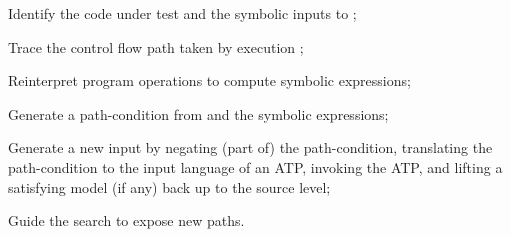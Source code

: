 \documentclass{IOS-Book-Article}
\begin{document}
\begin{mdUl}[class={list-star,compact},data-line={305}]%
\begin{mdLi}[data-line={305}]%
{}Identify the code under test %
{}%
{} and the symbolic inputs to %
{}%
{};%
\end{mdLi}%
\begin{mdLi}[data-line={306}]%
{}Trace the control flow path %
{}%
{} taken by execution %
{}%
{};%
\end{mdLi}%
\begin{mdLi}[data-line={307}]%
{}Reinterpret program operations to compute symbolic expressions;%
\end{mdLi}%
\begin{mdLi}[data-line={308}]%
{}Generate a path-condition from %
{}%
{} and the symbolic expressions;%
\end{mdLi}%
\begin{mdLi}[data-line={309}]%
{}Generate a new input %
{}%
{} by negating (part of) the path-condition, translating
the path-condition to the input language of an ATP, invoking the ATP, and
lifting a satisfying model (if any) back up to the source level;%
\end{mdLi}%
\begin{mdLi}[data-line={312}]%
{}Guide the search to expose new paths.%
\end{mdLi}%
\end{mdUl}%
\end{document}
